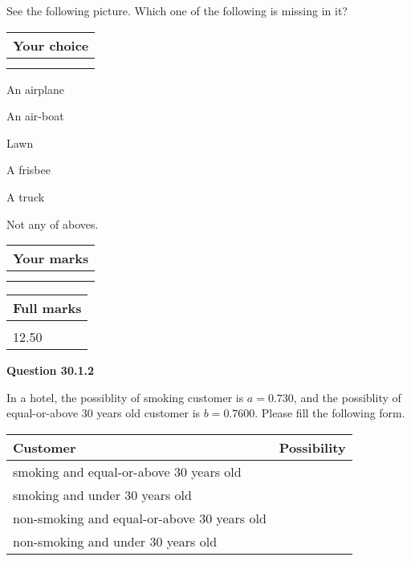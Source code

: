 \documentclass[12pt]{article}
\begin{document}
  
See the following picture.
Which one of the following is missing in it?
  
  
\noindent\hspace{3.0in} \begin{tabular}{|l|}
\hline
Your choice \\
\hline
 \\ 
 \\ 
\hline
\end{tabular}
  
  
 
 
An airplane
 
 
An air-boat
 
 
Lawn
 
 
A frisbee
 
 
A truck
 
 
  Not any of aboves.
 
 
 
\vspace{0.3in}
  
\vspace{0.2in}
  
         \begin{tabular}{|l|}
\hline
 Your marks  \\
\hline
 \\ 
 \\ 
\hline
\end{tabular}
\hspace{0.05in} \begin{tabular}{|l|}
\hline
 Full marks  \\
\hline
 \\ 
12.50 \\
\hline
\end{tabular}
{\textbf{\Large{Question
30.1.2 
}}}
  
  
In a hotel, the possiblity of  %
smoking customer is
$a =  %
0.730$, and the possiblity of  %
equal-or-above 30 years old customer is $ b =  %
0.7600$.
Please fill the following form.
 
\noindent
\begin{tabular}{|l|l|}
\hline
Customer & Possibility \\
\hline
smoking  and   %
equal-or-above 30 years old  & \\
\hline
smoking  and   %
under 30 years old & \\
\hline
 non-smoking and   %
equal-or-above 30 years old  & \\
\hline
 non-smoking and  %
under 30 years old & \\
\hline
\end{tabular}
 
\end{document}

